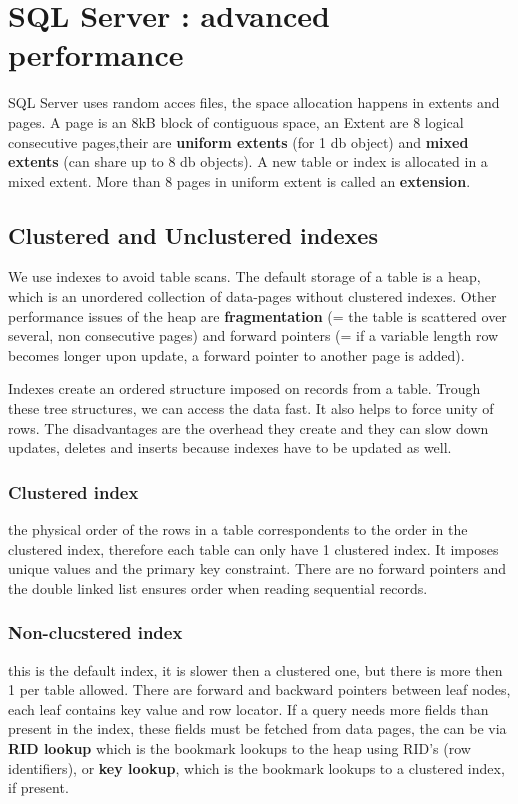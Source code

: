\documentclass{report}
\begin{document}
	\chapter{SQL Server : advanced performance}
		SQL Server uses random acces files, the space allocation happens in extents and pages. A page is an 8kB block of contiguous space, an Extent are 8 logical consecutive pages,their are \textbf{uniform extents} (for 1 db object) and \textbf{mixed extents} (can share up to 8 db objects). A new table or index is allocated in a mixed extent. More than 8 pages in uniform extent is called an \textbf{extension}.
		\section{Clustered and Unclustered indexes}
			We use indexes to avoid table scans. The default storage of a table is a heap, which is an unordered collection of data-pages without clustered indexes. Other performance issues of the heap are \textbf{fragmentation} (= the table is scattered over several, non consecutive pages) and forward pointers (= if a variable length row becomes longer upon update, a forward pointer to another page is added).
	
			Indexes create an ordered structure imposed on records from a table. Trough these tree structures, we can access the data fast. It also helps to force unity of rows. The disadvantages are the overhead they create and they can slow down updates, deletes and inserts because indexes have to be updated as well.
			\subsection{Clustered index}
				the physical order of the rows in a table correspondents to the order in the clustered index, therefore each table can only have 1 clustered index. It imposes unique values and the primary key constraint. There are no forward pointers and the double linked list ensures order when reading sequential records.
			\subsection{Non-clucstered index}
				this is the default index, it is slower then a clustered one, but there is more then 1 per table allowed. There are forward and backward pointers between leaf nodes, each leaf contains key value and row locator. If a query needs more fields than present in the index, these fields must be fetched from data pages, the can be via \textbf{RID lookup} which is the bookmark lookups to the heap using RID's (row identifiers), or \textbf{key lookup}, which is the bookmark lookups to a clustered index, if present.
\end{document}
